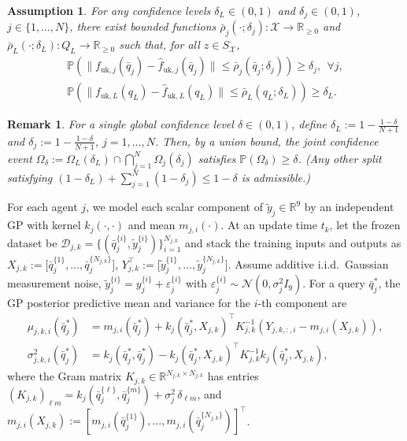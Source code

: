 \documentclass[letterpaper, 10 pt, conference]{ieeeconf}  %
\newcommand{\0}{\matr{0}}
\newtheorem{assumption}{Assumption}
\newtheorem{remark}{Remark}
\begin{document}
\begin{assumption} \label{ass:oracle_bound}For any confidence levels $\delta_L\in(0,1)$ and
$\delta_j\in(0,1)$, $j\in\{1,\dots,N\}$, there exist bounded functions
$\bar\rho_j(\cdot;\delta_j):\mathcal{X}\to\mathbb{R}_{\ge 0}$ and
$\bar\rho_L(\cdot;\delta_L):Q_L\to\mathbb{R}_{\ge 0}$ such that, for all $z\in S_\mathcal{X}$,
\begin{align}
\mathbb{P}\!\left(\|f_{\mathrm{uk},j}(\bar q_j)-\hat f_{\mathrm{uk},j}(\bar q_j)\|
\le \bar\rho_j(\bar q_j;\delta_j)\right) \ge \delta_j,\ \ \forall j, \label{eq:ass2_agent}
\\
\mathbb{P}\!\left(\|f_{\mathrm{uk},L}(q_L)-\hat f_{\mathrm{uk},L}(q_L)\|
\le \bar\rho_L(q_L;\delta_L)\right) \ge \delta_L. \label{eq:ass2_payload}
\end{align}
\end{assumption}

\begin{remark}\label{rem1} For a single global confidence level $\delta\in(0,1)$, define $\delta_L := 1-\frac{1-\delta}{N+1}$ and $\delta_j := 1-\frac{1-\delta}{N+1}$, $j=1,\dots,N$. Then, by a union bound, the joint confidence event
$\Omega_\delta := \Omega_L(\delta_L)\cap\bigcap_{j=1}^N\Omega_j(\delta_j)$
satisfies $\mathbb{P}(\Omega_\delta)\ge \delta$.
(Any other split satisfying $(1-\delta_L)+\sum_{j=1}^N(1-\delta_j)\le 1-\delta$
is admissible.)\end{remark}

For each agent $j$, we model each scalar component of $\tilde y_j\in\mathbb R^9$ by an independent GP
with kernel $k_j(\cdot,\cdot)$ and mean $m_{j,i}(\cdot)$.
At an update time $t_k$, let the frozen dataset be $\mathcal D_{j,k}=\{(\bar q_j^{\{i\}},\tilde y_j^{\{i\}})\}_{i=1}^{N_{j,k}}$ and
stack the training inputs and outputs as $X_{j,k}:=\big[\bar q_j^{\{1\}},\ldots,\bar q_j^{\{N_{j,k}\}}\big]$, $Y_{j,k}^\top:=\big[\tilde y_j^{\{1\}},\ldots,\tilde y_j^{\{N_{j,k}\}}\big]$. Assume additive i.i.d.\ Gaussian measurement noise,
$\tilde y_j^{\{i\}} = y_j^{\{i\}} + \varepsilon_{j}^{\{i\}}$ with $\varepsilon_{j}^{\{i\}}\sim\mathcal N(0,\sigma_j^2 I_9)$.
For a query $\bar q_j^*$, the GP posterior predictive mean and variance for the $i$-th component are
\begin{align*}
\mu_{j,k,i}(\bar q_j^*)
&= m_{j,i}(\bar q_j^*)
+ k_j(\bar q_j^*,X_{j,k})^\top K_{j,k}^{-1}\!\left(Y_{j,k,:,i}-m_{j,i}(X_{j,k})\right),
\\
\sigma^2_{j,k,i}(\bar q_j^*)
&= k_j(\bar q_j^*,\bar q_j^*)
- k_j(\bar q_j^*,X_{j,k})^\top K_{j,k}^{-1}k_j(\bar q_j^*,X_{j,k}),
\end{align*}
where the Gram matrix $K_{j,k}\in\mathbb R^{N_{j,k}\times N_{j,k}}$ has entries $(K_{j,k})_{\ell m}=k_j(\bar q_j^{\{\ell\}},\bar q_j^{\{m\}})+\sigma_j^2\,\delta_{\ell m}$, and
$m_{j,i}(X_{j,k}):=[m_{j,i}(\bar q_j^{\{1\}}),\ldots,m_{j,i}(\bar q_j^{\{N_{j,k}\}})]^\top$.
\end{document}
